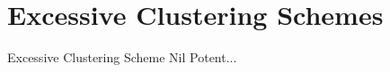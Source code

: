 \chapter{Excessive Clustering Schemes}

\begin{definition}{Excessive Clustering Scheme}{}
Nil Potent...
\end{definition}
